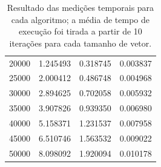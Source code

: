 \documentclass[fontsize=10pt]{article}
\begin{document}
\begin{table}[]
\begin{tabular}{@{}r|ccc@{}}
20000                                                                                              & 1.245493             & 0.318745                & 0.003837            \\
25000                                                                                              & 2.000412             & 0.486748                & 0.004968            \\
30000                                                                                              & 2.894625             & 0.702058                & 0.005932            \\
35000                                                                                              & 3.907826             & 0.939350                & 0.006980            \\
40000                                                                                              & 5.158371             & 1.231537                & 0.007958            \\
45000                                                                                              & 6.510746             & 1.563532                & 0.009022            \\
50000                                                                                              & 8.098092             & 1.920094                & 0.010178           
\end{tabular}
\caption{Resultado das medições temporais para cada algoritmo; a média de tempo de execução foi tirada a partir de 10 iterações para cada tamanho de vetor.}
\label{Tabela 1}
\end{table}
\end{document}
